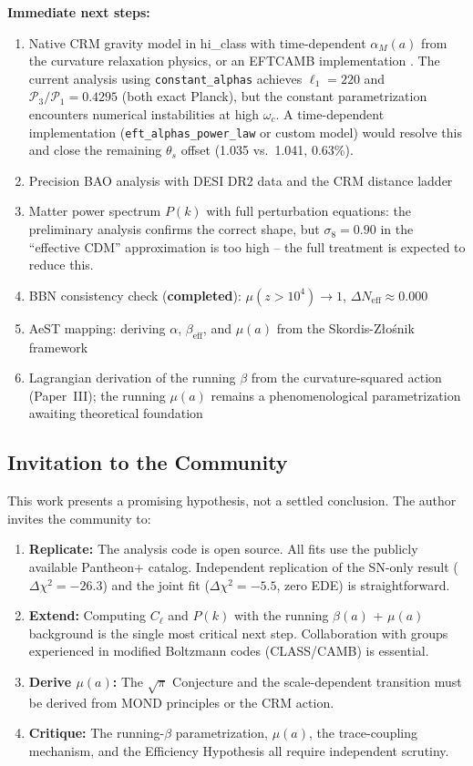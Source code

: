 \documentclass[aps,prd,twocolumn,superscriptaddress,nofootinbib]{revtex4-2}
\begin{document}
\textbf{Immediate next steps:}
\begin{enumerate}
\item Native CRM gravity model in hi\_class with time-dependent $\alpha_M(a)$ from the curvature relaxation physics, or an EFTCAMB implementation \cite{Hu2014}. The current analysis using \texttt{constant\_alphas} achieves $\ell_1 = 220$ and $\mathcal{P}_3/\mathcal{P}_1 = 0.4295$ (both exact Planck), but the constant parametrization encounters numerical instabilities at high $\omega_c$. A time-dependent implementation (\texttt{eft\_alphas\_power\_law} or custom model) would resolve this and close the remaining $\theta_s$ offset (1.035 vs.\ 1.041, 0.63\%).
\item Precision BAO analysis with DESI DR2 data and the CRM distance ladder
\item Matter power spectrum $P(k)$ with full perturbation equations: the preliminary analysis confirms the correct shape, but $\sigma_8 = 0.90$ in the ``effective CDM'' approximation is too high -- the full treatment is expected to reduce this.
\item BBN consistency check (\textbf{completed}): $\mu(z > 10^4) \to 1$, $\Delta N_{\mathrm{eff}} \approx 0.000$ \cite{Pitrou2018}
\item AeST mapping: deriving $\alpha$, $\beta_{\mathrm{eff}}$, and $\mu(a)$ from the Skordis-Z{\l}o\'snik framework
\item Lagrangian derivation of the running $\beta$ from the curvature-squared action (Paper~III); the running $\mu(a)$ remains a phenomenological parametrization awaiting theoretical foundation
\end{enumerate}

\subsection{Invitation to the Community}

This work presents a promising hypothesis, not a settled conclusion. The author invites the community to:
\begin{enumerate}
\item \textbf{Replicate:} The analysis code is open source. All fits use the publicly available Pantheon+ catalog. Independent replication of the SN-only result ($\Delta\chi^2 = -26.3$) and the joint fit ($\Delta\chi^2 = -5.5$, zero EDE) is straightforward.
\item \textbf{Extend:} Computing $C_\ell$ and $P(k)$ with the running $\beta(a)$ + $\mu(a)$ background is the single most critical next step. Collaboration with groups experienced in modified Boltzmann codes (CLASS/CAMB) is essential.
\item \textbf{Derive $\mu(a)$:} The $\sqrt{\pi}$ Conjecture and the scale-dependent transition must be derived from MOND principles or the CRM action.
\item \textbf{Critique:} The running-$\beta$ parametrization, $\mu(a)$, the trace-coupling mechanism, and the Efficiency Hypothesis all require independent scrutiny.
\end{enumerate}
\end{document}
